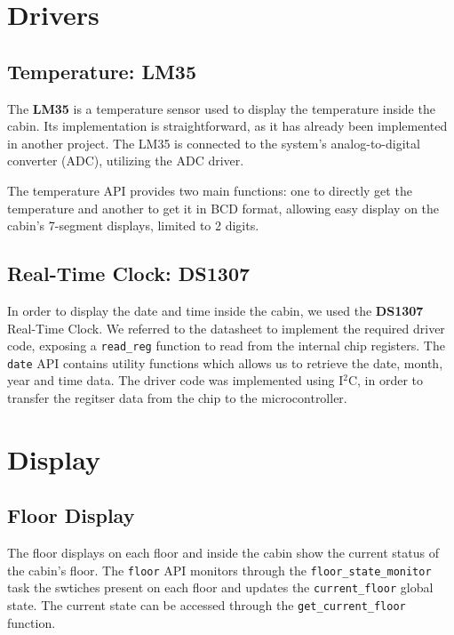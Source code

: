 \documentclass[12pt, a4paper]{report}
\begin{document}
\chapter{Drivers}

\section{Temperature: LM35}

The \textbf{LM35} is a temperature sensor used to display the temperature inside the cabin. Its implementation is straightforward, as it has already been implemented in another project. The LM35 is connected to the system's analog-to-digital converter (ADC), utilizing the ADC driver.

The temperature API provides two main functions: one to directly get the temperature and another to get it in BCD format, allowing easy display on the cabin's 7-segment displays, limited to 2 digits.

\section{Real-Time Clock: DS1307}

In order to display the date and time inside the cabin, we used the \textbf{DS1307} Real-Time Clock. We referred to the datasheet to implement the required driver code, exposing a \texttt{read\_reg} function to read from the internal chip registers. The \texttt{date} API contains utility functions which allows us to retrieve the date, month, year and time data.
The driver code was implemented using I$^2$C, in order to transfer the regitser data from the chip to the microcontroller.

\chapter{Display}

\section{Floor Display}

The floor displays on each floor and inside the cabin show the current status of the cabin's floor. The \texttt{floor} API monitors through the \texttt{floor\_state\_monitor} task the swtiches present on each floor and updates the \texttt{current\_floor} global state. The current state can be accessed through the \texttt{get\_current\_floor} function.
\end{document}
